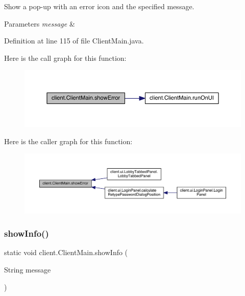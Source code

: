 Show a pop-\/up with an error icon and the specified message.


\begin{DoxyParams}{Parameters}
{\em message} & \\
\hline
\end{DoxyParams}


Definition at line 115 of file Client\+Main.\+java.

Here is the call graph for this function\+:
\nopagebreak
\begin{figure}[H]
\begin{center}
\leavevmode
\includegraphics[width=350pt]{classclient_1_1_client_main_ab814569831a92249ded3d7258c0ac929_cgraph}
\end{center}
\end{figure}
Here is the caller graph for this function\+:
\nopagebreak
\begin{figure}[H]
\begin{center}
\leavevmode
\includegraphics[width=350pt]{classclient_1_1_client_main_ab814569831a92249ded3d7258c0ac929_icgraph}
\end{center}
\end{figure}
\hypertarget{classclient_1_1_client_main_af975fd50f5fb1cc3ec29b65854b2a412}{}\label{classclient_1_1_client_main_af975fd50f5fb1cc3ec29b65854b2a412} 
\subsubsection{\texorpdfstring{show\+Info()}{showInfo()}}
{\footnotesize\ttfamily static void client.\+Client\+Main.\+show\+Info (\begin{DoxyParamCaption}\item[{String}]{message }\end{DoxyParamCaption})\hspace{0.3cm}{\ttfamily [static]}}

